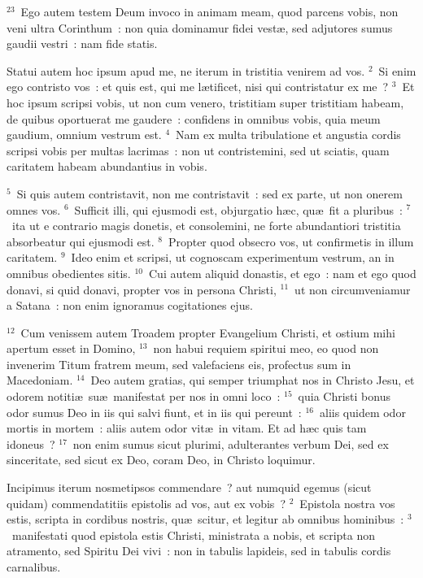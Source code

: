 ${}^{23}$~Ego autem testem Deum invoco in animam meam, quod parcens vobis, non veni ultra Corinthum~: non quia dominamur fidei vest\ae , sed adjutores sumus gaudii vestri~: nam fide statis.

\bchapter
\lettrine[lines=3,image=true,loversize=0.05,lraise=-0.03]{S}{}tatui autem hoc ipsum apud me, ne iterum in tristitia venirem ad vos.
${}^{2}$~Si enim ego contristo vos~: et quis est, qui me l\ae tificet, nisi qui contristatur ex me~?
${}^{3}$~Et hoc ipsum scripsi vobis, ut non cum venero, tristitiam super tristitiam habeam, de quibus oportuerat me gaudere~: confidens in omnibus vobis, quia meum gaudium, omnium vestrum est.
${}^{4}$~Nam ex multa tribulatione et angustia cordis scripsi vobis per multas lacrimas~: non ut contristemini, sed ut sciatis, quam caritatem habeam abundantius in vobis.


${}^{5}$~Si quis autem contristavit, non me contristavit~: sed ex parte, ut non onerem omnes vos.
${}^{6}$~Sufficit illi, qui ejusmodi est, objurgatio h\ae c, qu\ae\ fit a pluribus~:
${}^{7}$~ita ut e contrario magis donetis, et consolemini, ne forte abundantiori tristitia absorbeatur qui ejusmodi est.
${}^{8}$~Propter quod obsecro vos, ut confirmetis in illum caritatem.
${}^{9}$~Ideo enim et scripsi, ut cognoscam experimentum vestrum, an in omnibus obedientes sitis.
${}^{10}$~Cui autem aliquid donastis, et ego~: nam et ego quod donavi, si quid donavi, propter vos in persona Christi,
${}^{11}$~ut non circumveniamur a Satana~: non enim ignoramus cogitationes ejus.


${}^{12}$~Cum venissem autem Troadem propter Evangelium Christi, et ostium mihi apertum esset in Domino,
${}^{13}$~non habui requiem spiritui meo, eo quod non invenerim Titum fratrem meum, sed valefaciens eis, profectus sum in Macedoniam.
${}^{14}$~Deo autem gratias, qui semper triumphat nos in Christo Jesu, et odorem notiti\ae\ su\ae\ manifestat per nos in omni loco~:
${}^{15}$~quia Christi bonus odor sumus Deo in iis qui salvi fiunt, et in iis qui pereunt~:
${}^{16}$~aliis quidem odor mortis in mortem~: aliis autem odor vit\ae\ in vitam. Et ad h\ae c quis tam idoneus~?
${}^{17}$~non enim sumus sicut plurimi, adulterantes verbum Dei, sed ex sinceritate, sed sicut ex Deo, coram Deo, in Christo loquimur.

\bchapter
\lettrine[lines=3,image=true,loversize=0.05,lraise=-0.03]{I}{}ncipimus iterum nosmetipsos commendare~? aut numquid egemus (sicut quidam) commendatitiis epistolis ad vos, aut ex vobis~?
${}^{2}$~Epistola nostra vos estis, scripta in cordibus nostris, qu\ae\ scitur, et legitur ab omnibus hominibus~:
${}^{3}$~manifestati quod epistola estis Christi, ministrata a nobis, et scripta non atramento, sed Spiritu Dei vivi~: non in tabulis lapideis, sed in tabulis cordis carnalibus.


